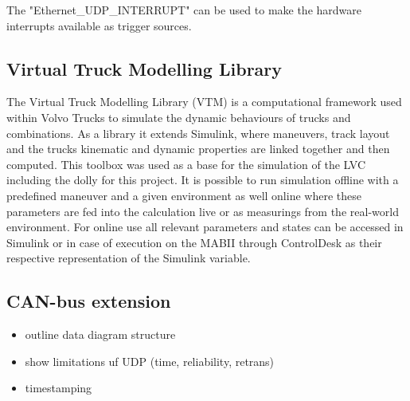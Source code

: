 \documentclass[ExampleMasters.tex]{subfiles}
\begin{document}
The "Ethernet\_UDP\_INTERRUPT" can be used to make the hardware interrupts available as trigger sources.
\subsection{Virtual Truck Modelling Library}
\label{sec:VTM}
The Virtual Truck Modelling Library (VTM) is a computational framework used within Volvo Trucks to simulate the dynamic behaviours of trucks and combinations. As a library it extends Simulink, where maneuvers, track layout and the trucks kinematic and dynamic properties are linked together and then computed. This toolbox was used as a base for the simulation of the LVC including the dolly for this project. It is possible to run simulation offline with a predefined maneuver and a given environment as well online where these parameters are fed into the calculation live or as measurings from the real-world environment. For online use all relevant parameters and states can be accessed in Simulink or in case of execution on the MABII through ControlDesk as their respective representation of the Simulink variable. 

\subsection{CAN-bus extension}
\label{sec:can_bus_extension_software}

\begin{itemize}
	\item outline data diagram structure
	\item show limitations uf UDP (time, reliability, retrans)
	\item timestamping
	
	
\end{itemize}
\end{document}

